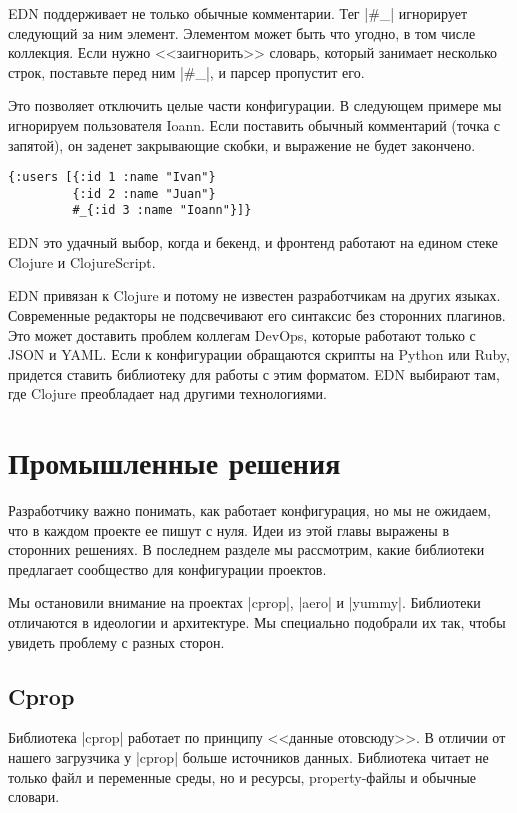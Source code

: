EDN поддерживает не только обычные комментарии. Тег \spverb|#_| игнорирует
следующий за ним элемент. Элементом может быть что угодно, в том числе
коллекция. Если нужно <<заигнорить>> словарь, который занимает несколько строк,
поставьте перед ним \spverb|#_|, и парсер пропустит его.

Это позволяет отключить целые части конфигурации. В следующем примере мы
игнорируем пользователя Ioann. Если поставить обычный комментарий (точка с
запятой), он заденет закрывающие скобки, и выражение не будет закончено.

\begin{verbatim}
{:users [{:id 1 :name "Ivan"}
         {:id 2 :name "Juan"}
         #_{:id 3 :name "Ioann"}]}
\end{verbatim}

EDN это удачный выбор, когда и бекенд, и фронтенд работают на едином стеке
Clojure и ClojureScript.

EDN привязан к Clojure и потому не известен разработчикам на других
языках. Современные редакторы не подсвечивают его синтаксис без сторонних
плагинов. Это может доставить проблем коллегам DevOps, которые работают только с
JSON и YAML. Если к конфигурации обращаются скрипты на Python или Ruby, придется
ставить библиотеку для работы с этим форматом. EDN выбирают там, где Clojure
преобладает над другими технологиями.

\section{Промышленные решения}

Разработчику важно понимать, как работает конфигурация, но мы не ожидаем, что в
каждом проекте ее пишут с нуля. Идеи из этой главы выражены в сторонних
решениях. В последнем разделе мы рассмотрим, какие библиотеки предлагает
сообщество для конфигурации проектов.

Мы остановили внимание на проектах \spverb|cprop|, \spverb|aero| и
\spverb|yummy|. Библиотеки отличаются в идеологии и архитектуре. Мы специально
подобрали их так, чтобы увидеть проблему с разных сторон.

\subsection{Cprop}

Библиотека \spverb|cprop| работает по
принципу <<данные отовсюду>>. В отличии от нашего загрузчика у \spverb|cprop|
больше источников данных. Библиотека читает не только файл и переменные среды,
но и ресурсы, property-файлы и обычные словари.

